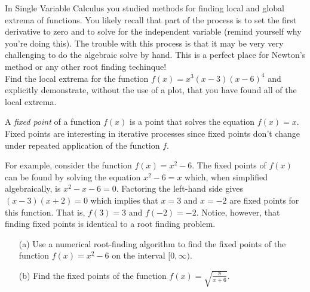\begin{problem}
    In Single Variable Calculus you studied methods for finding local and global extrema
    of functions. You likely recall that part of the process is to set the first
    derivative to zero and to solve for the independent variable (remind yourself why
    you're doing this).  The trouble with this process is that it may be very very
    challenging to do the algebraic solve by hand.  This is a perfect place for Newton's
    method or any other root finding techinque! \\
    Find the local extrema for the function $f(x) = x^3(x-3)(x-6)^4$ and explicitly
    demonstrate, without the use of a plot, that you have found all of the local extrema.
\end{problem}



\begin{problem}

    A {\it fixed point} of a function $f(x)$ is a point that solves the equation $f(x) =
    x$.  Fixed points are interesting in iterative processes since fixed points don't
    change under repeated application of the function $f$.  

    For example, consider the function $f(x) = x^2 - 6$.  The fixed points of $f(x)$ can be found by
    solving the equation $x^2 - 6 = x$ which, when simplified algebraically, is $x^2 - x -
    6 = 0$.  Factoring the left-hand side gives $(x-3)(x+2)=0$ which implies that $x=3$
    and $x=-2$ are fixed points for this function. That is, $f(3) = 3$ and $f(-2) = -2$.
    Notice, however, that finding fixed points is identical to a root finding problem.
    \begin{enumerate}
        \item[(a)] Use a numerical root-finding algorithm to find the fixed points of the
            function $f(x) = x^2 - 6$ on the interval $[0,\infty)$.
            \item[(b)] Find the fixed points of the function $f(x) =
                \sqrt{\frac{8}{x+6}}$.
        \end{enumerate}
    \end{problem}


